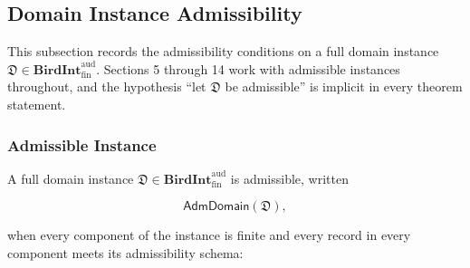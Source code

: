\documentclass[11pt]{article}
\theoremstyle{definition}
\begin{document}
\subsection{Domain Instance Admissibility}

This subsection records the admissibility conditions on a full domain instance \(\mathfrak D\in\mathbf{BirdInt}^{\mathrm{aud}}_{\mathrm{fin}}\). Sections 5 through 14 work with admissible instances throughout, and the hypothesis ``let \(\mathfrak D\) be admissible'' is implicit in every theorem statement.

\subsubsection{Admissible Instance}

A full domain instance \(\mathfrak D\in\mathbf{BirdInt}^{\mathrm{aud}}_{\mathrm{fin}}\) is admissible, written

\[
\mathsf{AdmDomain}(\mathfrak D),
\]

when every component of the instance is finite and every record in every component meets its admissibility schema:
\end{document}
